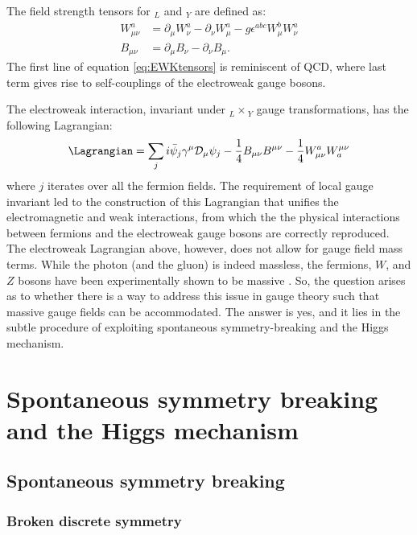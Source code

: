 The field strength tensors for $_L$ and $_Y$ are defined as: 
\begin{align} \label{eq:EWKtensors}
    W^a_{\mu\nu} & =\partial_{\mu}W^a_{\nu}-\partial_{\nu}W^a_{\mu}-g\epsilon^{abc}W^b_{\mu}W^a_{\nu}\\
    B_{\mu\nu} & =\partial_{\mu}B_{\nu}-\partial_{\nu}B_{\mu}.
\end{align}
The first line of equation \ref{eq:EWKtensors} is reminiscent of QCD, where last term gives rise to self-couplings of the electroweak gauge bosons. 

The electroweak interaction, invariant under $_L\times$$_Y$ gauge transformations, has the following Lagrangian:
\begin{equation}
    \Lagrangian=\sum_{j}i\bar{\psi}_j\gamma^{\mu}\mathcal{D}_{\mu}\psi_j-\dfrac{1}{4}B_{\mu\nu}B^{\mu\nu}-\dfrac{1}{4}W^a_{\mu\nu}W_a^{\mu\nu}
\end{equation}
where $j$ iterates over all the fermion fields. The requirement of local gauge invariant led to the construction of this Lagrangian that unifies the electromagnetic and weak interactions, from which the the physical interactions between fermions and the electroweak gauge bosons are correctly reproduced. The electroweak Lagrangian above, however, does not allow for gauge field mass terms. While the photon (and the gluon) is indeed massless, the fermions, $W$, and $Z$ bosons have been experimentally shown to be massive \cite{pdg_2021}. So, the question arises as to whether there is a way to address this issue in gauge theory such that massive gauge fields can be accommodated. The answer is yes, and it lies in the subtle procedure of exploiting spontaneous symmetry-breaking and the Higgs mechanism.

\section{Spontaneous symmetry breaking and the Higgs mechanism} \label{sec:SSBHiggsMechanism}
\subsection{Spontaneous symmetry breaking}\label{ssec:SSB}
\subsubsection{Broken discrete symmetry}

